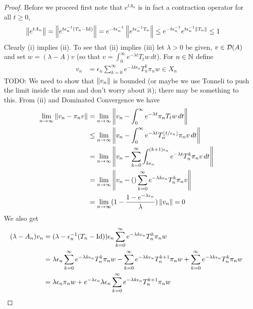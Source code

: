 \begin{proof}
Before we proceed first note that $e^{t A_n}$ is in fact a contraction operator for all $t \geq 0$,
\begin{align*}
\left \lVert e^{t A_n} \right \rVert &= \left \lVert e^{t \epsilon_n^{-1}(T_n - \operatorname*{Id})} \right \rVert = e^{-t \epsilon_n^{-1}} \left \lVert e^{t \epsilon_n^{-1} T_n} \right \rVert \leq e^{-t \epsilon_n^{-1}} e^{t \epsilon_n^{-1} \left \lVert T_n \right \rVert} \leq 1
\end{align*}
Clearly (i) implies (ii).  To see that (ii) implies (iii) let $\lambda > 0$ be given, $v \in \mathcal{D}(A)$ and set $w = (\lambda - A) v$ (so that $v = \int_0^\infty e^{-\lambda t} T_t w \, dt$).  For $n \in \mathbb{N}$ define
\begin{align*}
v_n &= \epsilon_n \sum_{k=0}^\infty e^{-\lambda k \epsilon_n} T_n^k \pi_n w \in X_n
\end{align*}
TODO: We need to show that $\left \lVert v_n \right \rVert$ is bounded (or maybe we use Tonneli to push the limit inside the sum and don't worry about it); there may be something to this.
From (ii) and Dominated Convergence we have
\begin{align*}
\lim_{n \to \infty} \left \lVert v_n - \pi_n v \right \rVert &= \lim_{n \to \infty} \left \lVert v_n - \int_0^\infty e^{-\lambda t} \pi_n T_t w \, dt \right \rVert \\
&\leq  \lim_{n \to \infty} \left \lVert v_n - \int_0^\infty e^{-\lambda t} T^{\left \lfloor t/\epsilon_n \right \rfloor}_{n} \pi_n v \, dt \right \rVert \\
&= \lim_{n \to \infty} \left \lVert v_n - \sum_{k=0}^\infty \int_{k\epsilon_n}^{(k+1)\epsilon_n} e^{-\lambda t} T^{k}_{n} \pi_n v \, dt \right \rVert \\
&= \lim_{n \to \infty} \left \lVert v_n - () \sum_{k=0}^\infty e^{-\lambda k \epsilon_n} T^{k}_{n} \pi_n v  \right \rVert\\
&= \lim_{n \to \infty} (1 - \frac{1-e^{-\lambda \epsilon_n}}{\lambda})\left \lVert v_n \right \rVert  = 0\\
\end{align*}
We also get
\begin{align*}
(\lambda - A_n) v_n &= (\lambda - \epsilon_n^{-1}(T_n - \IdentityMatrix)) \epsilon_n \sum_{k=0}^\infty e^{-\lambda k \epsilon_n} T_n^k \pi_n w \\
&=\lambda \epsilon_n \sum_{k=0}^\infty e^{-\lambda k \epsilon_n} T_n^k \pi_n w 
- \sum_{k=0}^\infty e^{-\lambda k \epsilon_n} T_n^{k+1} \pi_n w +  
\sum_{k=0}^\infty e^{-\lambda k \epsilon_n} T_n^{k} \pi_n w \\
&= \lambda \epsilon_n \pi_n w 
+ e^{-\lambda \epsilon_n} \lambda \epsilon_n \sum_{k=0}^\infty e^{-\lambda k \epsilon_n} T_n^{k+1} \pi_n w 

\end{align*}
\end{proof}
